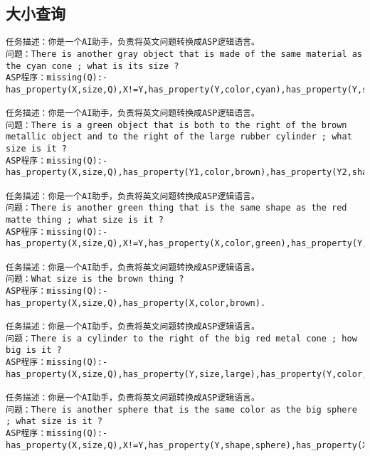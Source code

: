 \subsection{大小查询}
\begin{lstlisting}
任务描述：你是一个AI助手，负责将英文问题转换成ASP逻辑语言。
问题：There is another gray object that is made of the same material as the cyan cone ; what is its size ? 
ASP程序：missing(Q):-has_property(X,size,Q),X!=Y,has_property(Y,color,cyan),has_property(Y,shape,cone),has_property(X,color,gray),same_material(Y,X).

任务描述：你是一个AI助手，负责将英文问题转换成ASP逻辑语言。
问题：There is a green object that is both to the right of the brown metallic object and to the right of the large rubber cylinder ; what size is it ? 
ASP程序：missing(Q):-has_property(X,size,Q),has_property(Y1,color,brown),has_property(Y2,shape,cylinder),has_property(Y2,size,large),has_property(Y2,material,rubber),has_property(Y1,material,metal),has_property(X,color,green),right(Y1,X),right(Y2,X),X!=Y1,Y1!=Y2,X!=Y2. 

任务描述：你是一个AI助手，负责将英文问题转换成ASP逻辑语言。
问题：There is another green thing that is the same shape as the red matte thing ; what size is it ? 
ASP程序：missing(Q):-has_property(X,size,Q),X!=Y,has_property(X,color,green),has_property(Y,material,rubber),has_property(Y,color,red),same_shape(Y,X). 

任务描述：你是一个AI助手，负责将英文问题转换成ASP逻辑语言。
问题：What size is the brown thing ? 
ASP程序：missing(Q):-has_property(X,size,Q),has_property(X,color,brown). 

任务描述：你是一个AI助手，负责将英文问题转换成ASP逻辑语言。
问题：There is a cylinder to the right of the big red metal cone ; how big is it ? 
ASP程序：missing(Q):-has_property(X,size,Q),has_property(Y,size,large),has_property(Y,color,red),has_property(Y,material,metal),has_property(Y,shape,cone),has_property(X,shape,cylinder),right(Y,X),X!=Y. 

任务描述：你是一个AI助手，负责将英文问题转换成ASP逻辑语言。
问题：There is another sphere that is the same color as the big sphere ; what size is it ? 
ASP程序：missing(Q):-has_property(X,size,Q),X!=Y,has_property(Y,shape,sphere),has_property(X,shape,sphere),has_property(Y,size,large),same_color(Y,X).
\end{lstlisting}
